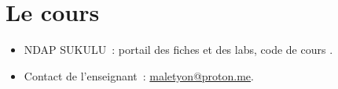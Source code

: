 \section*{Le cours}

\begin{itemize}
    \item NDAP SUKULU~: portail des fiches et des labs, code de cours
          \codeUE.
    \item Contact de l'enseignant~:
          \href{mailto:maletyon@proton.me}{maletyon@proton.me}.
\end{itemize}
